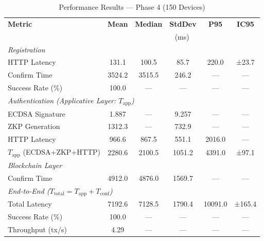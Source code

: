 %
%
\begin{table}[htbp]
\centering
\caption{Performance Results --- Phase 4 (150 Devices)}
\label{tab:phase4}
\begin{tabular}{lccccc}
\toprule
\textbf{Metric} & \textbf{Mean} & \textbf{Median} & \textbf{StdDev} & \textbf{P95} & \textbf{IC95} \\
                & \multicolumn{5}{c}{(ms)} \\
\midrule
\multicolumn{6}{l}{\textit{Registration}} \\
HTTP Latency      & 131.1 & 100.5 & 85.7 & 220.0 & ±23.7 \\
Confirm Time      & 3524.2 & 3515.5 & 246.2 & ---  & ---   \\
Success Rate (\%) & 100.0 & ---  & ---  & ---  & ---   \\
\midrule
\multicolumn{6}{l}{\textit{Authentication (Applicative Layer: $T_{\mathrm{app}}$)}} \\
ECDSA Signature   & 1.887 & ---  & 9.257 & ---  & ---   \\
ZKP Generation    & 1312.3 & ---  & 732.9 & ---  & ---   \\
HTTP Latency      & 966.6 & 867.5 & 551.1 & 2016.0 & ---   \\
$T_{\mathrm{app}}$ (ECDSA+ZKP+HTTP) & 2280.6 & 2100.5 & 1051.2 & 4391.0 & ±97.1 \\
\midrule
\multicolumn{6}{l}{\textit{Blockchain Layer}} \\
Confirm Time      & 4912.0 & 4876.0 & 1569.7 & ---  & ---   \\
\midrule
\multicolumn{6}{l}{\textit{End-to-End ($T_{\mathrm{total}} = T_{\mathrm{app}} + T_{\mathrm{conf}}$)}} \\
Total Latency     & 7192.6 & 7128.5 & 1790.4 & 10091.0 & ±165.4 \\
Success Rate (\%) & 100.0 & ---  & ---  & ---  & ---   \\
Throughput (tx/s) & 4.29 & ---  & ---  & ---  & ---   \\
\bottomrule
\end{tabular}
\end{table}
